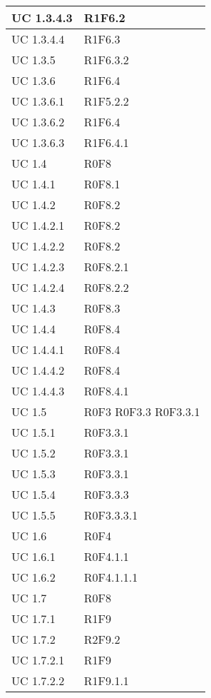 \begin{center}
\begin{longtable}{| p{4cm} | p{4cm} |}
		\hline
		UC 1.3.4.3  &  R1F6.2 \\
		\hline
		UC 1.3.4.4  &  R1F6.3 \\
		\hline
		UC 1.3.5  &  R1F6.3.2 \\
		\hline
		UC 1.3.6  &  R1F6.4 \\
		\hline
		UC 1.3.6.1  &  R1F5.2.2 \\
		\hline
		UC 1.3.6.2  &  R1F6.4 \\
		\hline
		UC 1.3.6.3  &  R1F6.4.1 \\
		\hline
		UC 1.4  &  R0F8 \\
		\hline
		UC 1.4.1  &  R0F8.1 \\
		\hline
		UC 1.4.2  &  R0F8.2 \\
		\hline
		UC 1.4.2.1  &  R0F8.2 \\
		\hline
		UC 1.4.2.2  &  R0F8.2 \\
		\hline
		UC 1.4.2.3  &  R0F8.2.1 \\
		\hline
		UC 1.4.2.4  &  R0F8.2.2 \\
		\hline
		UC 1.4.3  &  R0F8.3 \\
		\hline
		UC 1.4.4  &  R0F8.4 \\
		\hline
		UC 1.4.4.1  &  R0F8.4 \\
		\hline
		UC 1.4.4.2  &  R0F8.4 \\
		\hline
		UC 1.4.4.3  &  R0F8.4.1 \\
		\hline
		UC 1.5  &  R0F3 \newline R0F3.3 \newline R0F3.3.1 \\
		\hline
		UC 1.5.1  &  R0F3.3.1 \\
		\hline
		UC 1.5.2  &  R0F3.3.1 \\
		\hline
		UC 1.5.3  &  R0F3.3.1 \\
		\hline
		UC 1.5.4  &  R0F3.3.3 \\
		\hline
		UC 1.5.5  &  R0F3.3.3.1 \\
		\hline
		UC 1.6  &  R0F4 \\
		\hline
		UC 1.6.1  &  R0F4.1.1 \\
		\hline
		UC 1.6.2  &  R0F4.1.1.1 \\
		\hline
		UC 1.7  &  R0F8 \\
		\hline
		UC 1.7.1  &  R1F9 \\
		\hline
		UC 1.7.2  &  R2F9.2 \\
		\hline
		UC 1.7.2.1  &  R1F9 \\
		\hline
		UC 1.7.2.2  &  R1F9.1.1 \\
		\hline

\end{longtable}
\end{center}
